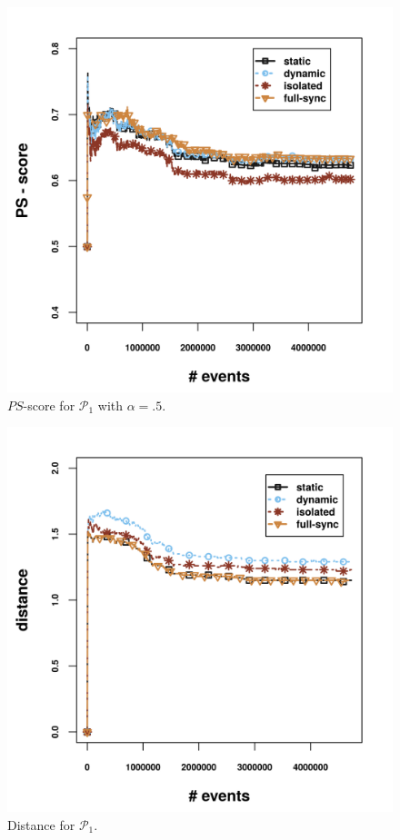 \begin{center}
	\centering
	\begin{figure}[H]
		
		\includegraphics[width=\textwidth,height=.9\textwidth,keepaspectratio]{chapters/figures/synopses/new/ps_score_p1.png}
		
		\caption{$PS$-score for $\mathcal{P}_1$ with $\alpha = .5$.}
		\label{fig:spread_prec}
	\end{figure}
\end{center}



\begin{center}
	\centering
	\begin{figure}[H]
		
		\includegraphics[width=\textwidth,height=.9\textwidth,keepaspectratio]{chapters/figures/synopses/new/distance_p1.png}
		
		\caption{Distance for $\mathcal{P}_1$.}
		\label{fig:distance_p1}
	\end{figure}
\end{center}

